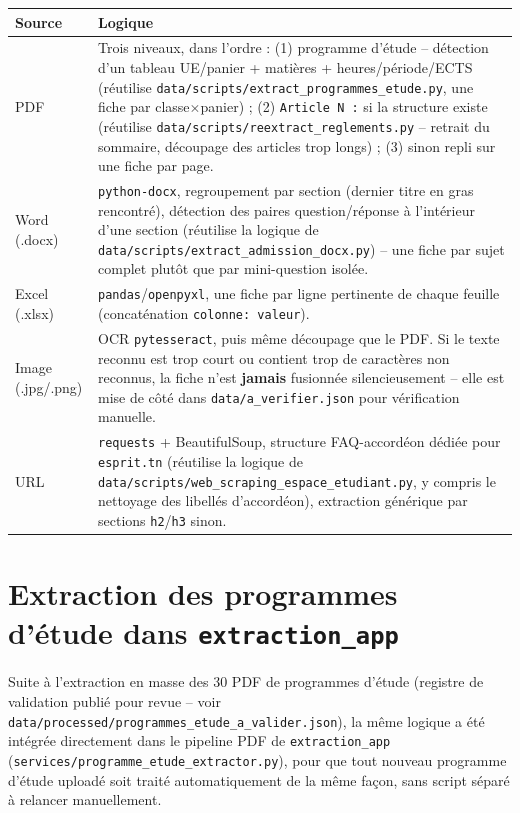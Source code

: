 \documentclass[11pt,a4paper]{report}
\begin{document}
\begin{center}
\begin{longtable}{@{}p{2.6cm}p{11cm}@{}}
\toprule
\textbf{Source} & \textbf{Logique} \\
\midrule
\endhead
PDF & Trois niveaux, dans l'ordre : (1) programme d'étude -- détection d'un tableau
UE/panier + matières + heures/période/ECTS (réutilise
\texttt{data/scripts/extract\_programmes\_etude.py}, une fiche par classe$\times$panier) ;
(2) \texttt{Article~N~:} si la structure existe (réutilise
\texttt{data/scripts/reextract\_reglements.py} -- retrait du sommaire, découpage des
articles trop longs) ; (3) sinon repli sur une fiche par page. \\
Word (.docx) & \texttt{python-docx}, regroupement par section (dernier titre en gras
rencontré), détection des paires question/réponse à l'intérieur d'une section (réutilise
la logique de \texttt{data/scripts/extract\_admission\_docx.py}) -- une fiche par sujet
complet plutôt que par mini-question isolée. \\
Excel (.xlsx) & \texttt{pandas}/\texttt{openpyxl}, une fiche par ligne pertinente de
chaque feuille (concaténation \texttt{colonne: valeur}). \\
Image (.jpg/.png) & OCR \texttt{pytesseract}, puis même découpage que le PDF. Si le
texte reconnu est trop court ou contient trop de caractères non reconnus, la fiche
n'est \textbf{jamais} fusionnée silencieusement -- elle est mise de côté dans
\texttt{data/a\_verifier.json} pour vérification manuelle. \\
URL & \texttt{requests} + BeautifulSoup, structure FAQ-accordéon dédiée pour
\texttt{esprit.tn} (réutilise la logique de
\texttt{data/scripts/web\_scraping\_espace\_etudiant.py}, y compris le nettoyage des
libellés d'accordéon), extraction générique par sections \texttt{h2}/\texttt{h3} sinon.
\\
\bottomrule
\end{longtable}
\end{center}

\section{Extraction des programmes d'étude dans \texttt{extraction\_app}}

Suite à l'extraction en masse des 30 PDF de programmes d'étude (registre de validation
publié pour revue -- voir \texttt{data/processed/programmes\_etude\_a\_valider.json}),
la même logique a été intégrée directement dans le pipeline PDF de
\texttt{extraction\_app} (\texttt{services/programme\_etude\_extractor.py}), pour que
tout nouveau programme d'étude uploadé soit traité automatiquement de la même façon,
sans script séparé à relancer manuellement.
\end{document}
